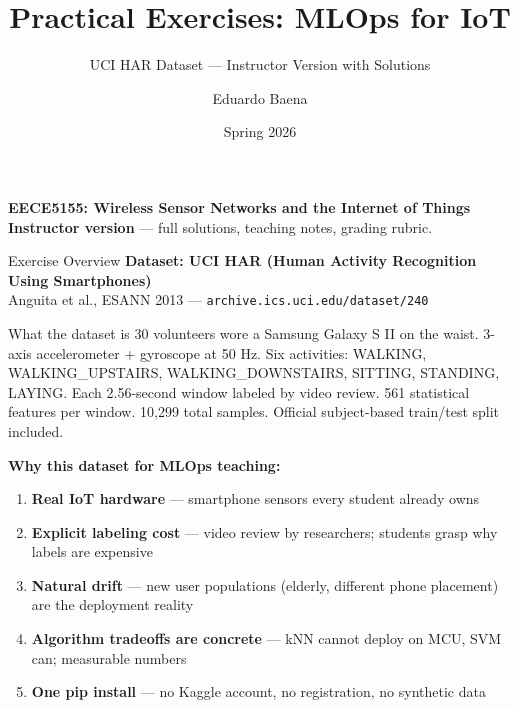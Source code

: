 \documentclass[aspectratio=169,11pt]{beamer}
\title[EECE5155 -- MLOps Exercises]{Practical Exercises: MLOps for IoT}
\subtitle{UCI HAR Dataset --- Instructor Version with Solutions}
\author{Eduardo Baena}
\date{Spring 2026}
\institute{Northeastern University\\
\texttt{e.baena@northeastern.edu}}
\begin{document}
\begin{frame}
    \titlepage
    \vspace{-1cm}
    \begin{center}
        \textbf{EECE5155: Wireless Sensor Networks and the Internet of Things}\\[4pt]
        {\small \textbf{Instructor version} --- full solutions, teaching notes, grading rubric.}
    \end{center}
\end{frame}

\begin{frame}{Exercise Overview}
    \textbf{Dataset: UCI HAR (Human Activity Recognition Using Smartphones)}\\
    {\small Anguita et al., ESANN 2013 --- \texttt{archive.ics.uci.edu/dataset/240}}

    \vspace{0.2cm}
    \begin{block}{What the dataset is}
        30 volunteers wore a Samsung Galaxy S II on the waist. 3-axis accelerometer + gyroscope at 50 Hz. Six activities: WALKING, WALKING\_UPSTAIRS, WALKING\_DOWNSTAIRS, SITTING, STANDING, LAYING. Each 2.56-second window labeled by video review. 561 statistical features per window. 10,299 total samples. Official subject-based train/test split included.
    \end{block}

    \vspace{0.2cm}
    \textbf{Why this dataset for MLOps teaching:}
    \begin{enumerate}
        \item \textbf{Real IoT hardware} --- smartphone sensors every student already owns
        \item \textbf{Explicit labeling cost} --- video review by researchers; students grasp why labels are expensive
        \item \textbf{Natural drift} --- new user populations (elderly, different phone placement) are the deployment reality
        \item \textbf{Algorithm tradeoffs are concrete} --- kNN cannot deploy on MCU, SVM can; measurable numbers
        \item \textbf{One pip install} --- no Kaggle account, no registration, no synthetic data
    \end{enumerate}
\end{frame}
\end{document}
